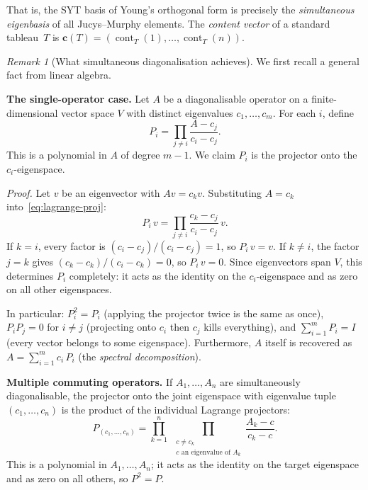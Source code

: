 \documentclass[12pt,a4paper]{article}
\theoremstyle{definition}
\theoremstyle{remark}
\newtheorem{remark}[theorem]{Remark}
\newcommand{\cont}{\operatorname{cont}}
\begin{document}
That is, the SYT basis of Young's orthogonal form is precisely the
\emph{simultaneous eigenbasis} of all Jucys--Murphy elements. The
\emph{content vector} of a standard tableau~$T$ is
$\mathbf{c}(T) = (\cont_T(1), \ldots, \cont_T(n))$.

\begin{remark}[What simultaneous diagonalisation achieves]
\label{rem:simdiag}
We first recall a general fact from linear algebra.

\medskip\noindent\textbf{The single-operator case.}
Let $A$ be a diagonalisable operator on a finite-dimensional vector
space $V$ with distinct eigenvalues $c_1, \ldots, c_m$.
For each $i$, define
\begin{equation}\label{eq:lagrange-proj}
  P_i = \prod_{j \neq i} \frac{A - c_j}{c_i - c_j}.
\end{equation}
This is a polynomial in $A$ of degree $m - 1$. We claim $P_i$ is
the projector onto the $c_i$-eigenspace.

\emph{Proof.} Let $v$ be an eigenvector with $Av = c_k v$.
Substituting $A = c_k$ into~\eqref{eq:lagrange-proj}:
\[
  P_i\, v = \prod_{j \neq i} \frac{c_k - c_j}{c_i - c_j}\, v.
\]
If $k = i$, every factor is $(c_i - c_j)/(c_i - c_j) = 1$, so
$P_i\, v = v$. If $k \neq i$, the factor $j = k$ gives
$(c_k - c_k)/(c_i - c_k) = 0$, so $P_i\, v = 0$.
Since eigenvectors span $V$, this determines $P_i$ completely:
it acts as the identity on the $c_i$-eigenspace and as zero on
all other eigenspaces.

In particular: $P_i^2 = P_i$ (applying the projector twice is
the same as once), $P_i P_j = 0$ for $i \neq j$ (projecting onto
$c_i$ then $c_j$ kills everything), and $\sum_{i=1}^m P_i = I$
(every vector belongs to some eigenspace). Furthermore, $A$ itself
is recovered as $A = \sum_{i=1}^m c_i\, P_i$ (the \emph{spectral
decomposition}).

\medskip\noindent\textbf{Multiple commuting operators.}
If $A_1, \ldots, A_n$ are simultaneously diagonalisable, the
projector onto the joint eigenspace with eigenvalue tuple
$(c_1, \ldots, c_n)$ is the product of the individual Lagrange
projectors:
\[
  P_{(c_1,\ldots,c_n)}
  = \prod_{k=1}^n \;\prod_{\substack{c \neq c_k \\
    c \text{ an eigenvalue of } A_k}}
    \frac{A_k - c}{c_k - c}.
\]
This is a polynomial in $A_1, \ldots, A_n$; it acts as the identity
on the target eigenspace and as zero on all others, so
$P^2 = P$.


\end{remark}
\end{document}
